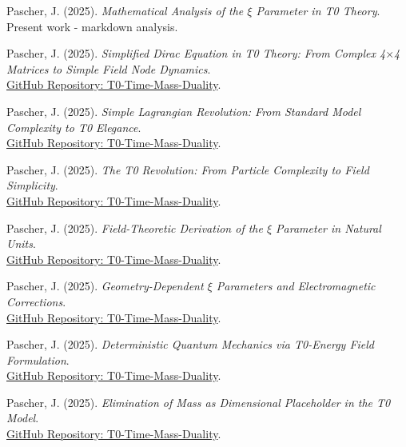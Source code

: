 \documentclass[12pt,a4paper]{article}
\newcommand{\mytimes}{\ensuremath{\times}}
\begin{document}
	\begin{thebibliography}{99}
		
		Pascher, J. (2025). \textit{Mathematical Analysis of the $\xi$ Parameter in T0 Theory}. \\
		Present work - markdown analysis.
		
		Pascher, J. (2025). \textit{Simplified Dirac Equation in T0 Theory: From Complex 4$\mytimes$4 Matrices to Simple Field Node Dynamics}. \\
		\href{https://github.com/jpascher/T0-Time-Mass-Duality/blob/main/2/pdf/diracVereinfachtEn.pdf}{GitHub Repository: T0-Time-Mass-Duality}.
		
		Pascher, J. (2025). \textit{Simple Lagrangian Revolution: From Standard Model Complexity to T0 Elegance}. \\
		\href{https://github.com/jpascher/T0-Time-Mass-Duality/blob/main/2/pdf/LagrandianVergleichEn.pdf}{GitHub Repository: T0-Time-Mass-Duality}.
		
		Pascher, J. (2025). \textit{The T0 Revolution: From Particle Complexity to Field Simplicity}. \\
		\href{https://github.com/jpascher/T0-Time-Mass-Duality/blob/main/2/pdf/systemEn.pdf}{GitHub Repository: T0-Time-Mass-Duality}.
		
		Pascher, J. (2025). \textit{Field-Theoretic Derivation of the $\xi$ Parameter in Natural Units}. \\
		\href{https://github.com/jpascher/T0-Time-Mass-Duality/blob/main/2/pdf/DerivationVonBetaEn.pdf}{GitHub Repository: T0-Time-Mass-Duality}.
		
		Pascher, J. (2025). \textit{Geometry-Dependent $\xi$ Parameters and Electromagnetic Corrections}. \\
		\href{https://github.com/jpascher/T0-Time-Mass-Duality/blob/main/2/pdf/Ho\_EnergieEn.pdf}{GitHub Repository: T0-Time-Mass-Duality}.
		
		Pascher, J. (2025). \textit{Deterministic Quantum Mechanics via T0-Energy Field Formulation}. \\
		\href{https://github.com/jpascher/T0-Time-Mass-Duality/blob/main/2/pdf/QM-DetrmisticEn.pdf}{GitHub Repository: T0-Time-Mass-Duality}.
		
		Pascher, J. (2025). \textit{Elimination of Mass as Dimensional Placeholder in the T0 Model}. \\
		\href{https://github.com/jpascher/T0-Time-Mass-Duality/blob/main/2/pdf/EliminationOfMassEn.pdf}{GitHub Repository: T0-Time-Mass-Duality}.
		
	\end{thebibliography}
	
\end{document}

